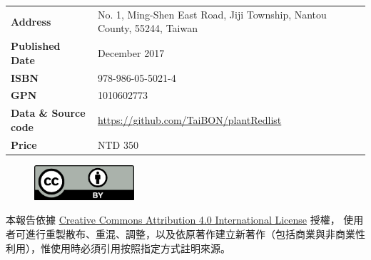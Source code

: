 \begin{table}[H]
{\begin{tabular}{>{\raggedleft\arraybackslash}p{3cm}p{8cm}}
      \textbf{Address}            & No. 1, Ming-Shen East Road, Jiji Township, Nantou County, 55244, Taiwan \\
      \textbf{Published Date}     & December 2017 \\
      \textbf{ISBN}              & 978-986-05-5021-4 \\
      \textbf{GPN}               & 1010602773 \\
      \textbf{Data \& Source code} & \href{https://github.com/TaiBON/plantRedlist}{https://github.com/TaiBON/plantRedlist} \\
      \textbf{Price}              & NTD 350 \\
  \end{tabular}
  }
\end{table}

\begin{figure}[H]
    \includegraphics[width=10em]{images/ccby40.png}
\end{figure}
\tiny \noindent 本報告依據 \href{https://creativecommons.org/licenses/by/4.0}{Creative Commons Attribution 4.0 International License} 授權，
使用者可進行重製散布、重混、調整，以及依原著作建立新著作（包括商業與非商業性利用），惟使用時必須引用按照指定方式註明來源。\\
